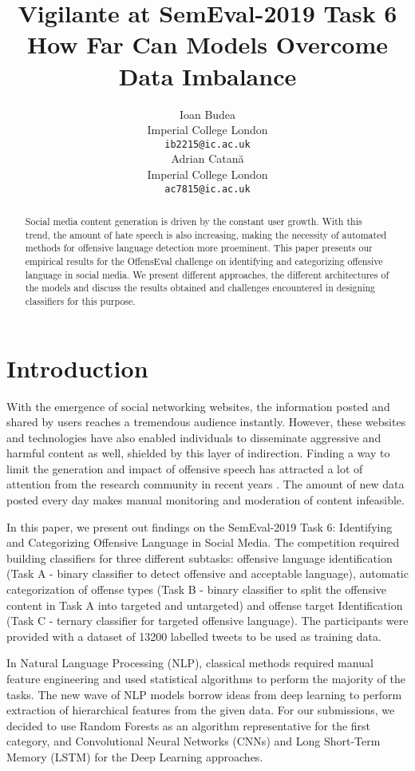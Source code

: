\documentclass[11pt,a4paper]{article}
\title{Vigilante at SemEval-2019 Task 6 \\ How Far Can Models Overcome Data Imbalance}
\author{Ioan Budea \\
  Imperial College London \\
  {\tt ib2215@ic.ac.uk} \\\And
  Adrian Catan\u{a} \\
  Imperial College London \\
  {\tt ac7815@ic.ac.uk} \\}
\date{}
\begin{document}
\maketitle
\begin{abstract}

  Social media content generation is driven by the constant user growth. With this trend, the amount of hate speech is also increasing, making the necessity of automated methods for offensive language detection more proeminent.
  This paper presents our empirical results for the OffensEval challenge on identifying and categorizing offensive language in social media. We present different approaches, the different architectures of the models and discuss the results obtained and challenges encountered in designing classifiers for this purpose.

\end{abstract}

\section{Introduction}
With the emergence of social networking websites, the information posted and shared by users reaches a tremendous audience instantly. However, these websites and technologies have also enabled individuals to disseminate aggressive and harmful content as well, shielded by this layer of indirection. Finding a way to limit the generation and impact of offensive speech has attracted a lot of attention from the research community in recent years \cite{Davidson, Malmasi}. The amount of new data posted every day makes manual monitoring and moderation of content infeasible.

In this paper, we present out findings on the SemEval-2019 Task 6: Identifying and Categorizing Offensive Language in Social Media. The competition required building classifiers for three different subtasks: offensive language identification (Task A - binary classifier to detect offensive and acceptable language), automatic categorization of offense types (Task B - binary classifier to split the offensive content in Task A into targeted and untargeted) and offense target Identification (Task C - ternary classifier for targeted offensive language). The participants were provided with a dataset of 13200 labelled tweets to be used as training data.

In Natural Language Processing (NLP), classical methods required manual feature engineering and used statistical algorithms to perform the majority of the tasks. The new wave of NLP models borrow ideas from deep learning to perform extraction of hierarchical features from the given data. For our submissions, we decided to use Random Forests as an algorithm representative for the first category, and Convolutional Neural Networks (CNNs) and Long Short-Term Memory (LSTM) for the Deep Learning approaches.
\end{document}
